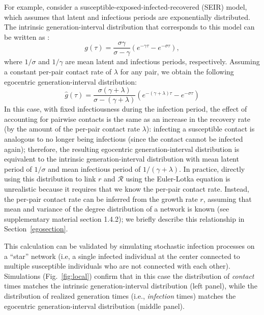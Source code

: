 \documentclass[12pt]{article}
\newcommand{\fref}[1]{Fig.~\ref{fig:#1}}
\newcommand{\RR}{\ensuremath{{\mathcal R}}}
\begin{document}
For example, consider a susceptible-exposed-infected-recovered (SEIR) model, which assumes that latent and infectious periods are exponentially distributed.
The intrinsic generation-interval distribution that corresponds to this model can be written as \citep{Champredon2018equivalence}:
\begin{equation}
g(\tau) = \frac{\sigma \gamma}{\sigma - \gamma} \left(e^{-\gamma \tau} - e^{-\sigma \tau}\right),
\end{equation}
where $1/\sigma$ and $1/\gamma$ are mean latent and infectious periods, respectively.
Assuming a constant per-pair contact rate of $\lambda$ for any pair, we obtain the following egocentric generation-interval distribution:
\begin{equation}
\hat{g}(\tau) = \frac{\sigma (\gamma + \lambda)}{\sigma - (\gamma + \lambda)} \left(e^{-(\gamma + \lambda)\tau} - e^{-\sigma \tau}\right)
\end{equation}
In this case, with fixed infectiousness during the infection period, the effect of accounting for pairwise contacts is the same as an increase in the recovery rate (by the amount of the per-pair contact rate $\lambda$): infecting a susceptible contact is analogous to no longer being infectious (since the contact cannot be infected again); therefore, the resulting egocentric generation-interval distribution is equivalent to the intrinsic generation-interval distribution with mean latent period of $1/\sigma$ and mean infectious period of $1/(\gamma + \lambda)$.
In practice, directly using this distribution to link $r$ and $\RR$ using the Euler-Lotka equation is unrealistic because it requires that we know the per-pair contact rate. 
Instead, the per-pair contact rate can be inferred from the growth rate $r$, assuming that mean and variance of the degree distribution of a network is known (see \cite{trapman2016inferring} supplementary material section 1.4.2);
we briefly describe this relationship in Section~\ref{egosection}.

This calculation can be validated by simulating stochastic infection processes on a ``star'' network (i.e, a single infected individual at the center connected to multiple susceptible individuals who are not connected with each other).
Simulations (\fref{local}) confirm that in this case the distribution of \emph{contact} times matches the intrinsic generation-interval distribution (left panel), while the distribution of realized generation times (i.e., \emph{infection} times) matches the egocentric generation-interval distribution (middle panel).
\end{document}
